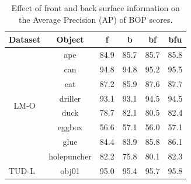 \begin{table}[b]
\centering
\footnotesize
\caption{Effect of front and back surface information on the Average Precision (AP) of BOP scores.}
\begin{tabular}{c|c|cccc}
\toprule
\multicolumn{1}{l|}{Dataset}                  & Object                           & f    & b    & bf   & bfu  \\
\midrule
\multicolumn{1}{c|}{\multirow{8}{*}{LM-O \cite{bib60}}}   & \multicolumn{1}{c|}{ape}         & \cellcolor[HTML]{D0E8F0} 84.9 & \cellcolor[HTML]{F8E8E8} 85.7 & \cellcolor[HTML]{F8E8E8} 85.7 & \cellcolor[HTML]{F0D0D0} 85.8 \\
\multicolumn{1}{c|}{}                        & \multicolumn{1}{c|}{can}         & \cellcolor[HTML]{D0E8F0} 94.8 & \cellcolor[HTML]{D0E8F0} 94.8 & \cellcolor[HTML]{F8E8E8} 95.2 & \cellcolor[HTML]{F0D0D0} 95.5 \\
\multicolumn{1}{c|}{}                        & \multicolumn{1}{c|}{cat}         & \cellcolor[HTML]{E8F4F8} 87.2 & \cellcolor[HTML]{D0E8F0} 85.9 & \cellcolor[HTML]{F8E8E8} 87.6 & \cellcolor[HTML]{F0D0D0} 87.7 \\
\multicolumn{1}{c|}{}                        & \multicolumn{1}{c|}{driller}     & \cellcolor[HTML]{D0E8F0} 93.1 & \cellcolor[HTML]{D0E8F0} 93.1 & \cellcolor[HTML]{F0D0D0} 94.5 & \cellcolor[HTML]{F0D0D0} 94.5 \\
\multicolumn{1}{c|}{}                        & \multicolumn{1}{c|}{duck}        & \cellcolor[HTML]{D0E8F0} 78.7 & \cellcolor[HTML]{F8E8E8} 82.1 & \cellcolor[HTML]{E8F4F8} 80.5 & \cellcolor[HTML]{F0D0D0} 82.4 \\
\multicolumn{1}{c|}{}                        & \multicolumn{1}{c|}{eggbox}      & \cellcolor[HTML]{E8F4F8} 56.6 & \cellcolor[HTML]{F0D0D0} 57.1 & \cellcolor[HTML]{D0E8F0} 56.0 & \cellcolor[HTML]{F0D0D0} 57.1 \\
\multicolumn{1}{c|}{}                        & \multicolumn{1}{c|}{glue}        & \cellcolor[HTML]{E8F4F8} 84.4 & \cellcolor[HTML]{D0E8F0} 83.9 & \cellcolor[HTML]{F8E8E8} 85.8 & \cellcolor[HTML]{F0D0D0} 86.1 \\
\multicolumn{1}{c|}{}                        & \multicolumn{1}{c|}{holepuncher} & \cellcolor[HTML]{F8E8E8} 82.2 & \cellcolor[HTML]{D0E8F0} 75.8 & \cellcolor[HTML]{E8F4F8} 80.1 & \cellcolor[HTML]{F0D0D0} 82.3 \\
\midrule
\multicolumn{1}{l|}{\multirow{3}{*}{TUD-L \cite{bib6}}}  & \multicolumn{1}{c|}{obj01}       & \cellcolor[HTML]{D0E8F0} 95.0 & \cellcolor[HTML]{E8F4F8} 95.4 & \cellcolor[HTML]{F8E8E8} 95.7 & \cellcolor[HTML]{F0D0D0} 95.8 \\

\end{tabular}
\end{table}
